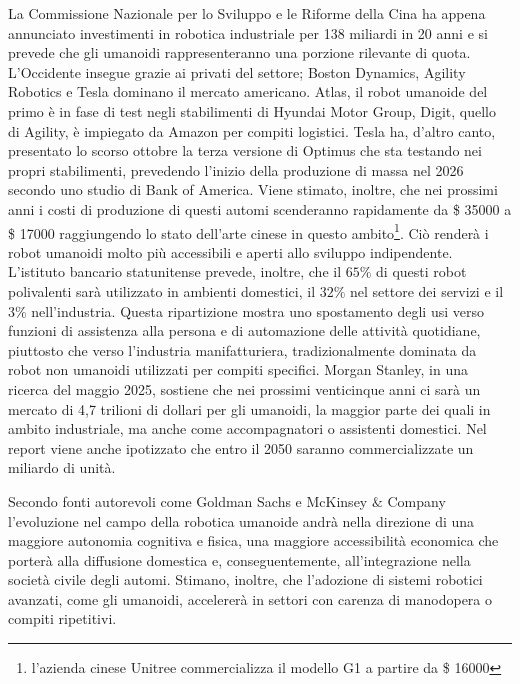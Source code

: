 La Commissione Nazionale per lo Sviluppo e le Riforme della Cina ha appena annunciato investimenti in robotica industriale per 138 miliardi in 20 anni\cite{ifr2023} e si prevede che gli umanoidi rappresenteranno una porzione rilevante di quota. L'Occidente insegue grazie ai privati del settore; Boston Dynamics, Agility Robotics e Tesla dominano il mercato americano. Atlas, il robot umanoide del primo è in fase di test negli stabilimenti di Hyundai Motor Group, Digit, quello di Agility, è impiegato da Amazon per compiti logistici. Tesla ha, d'altro canto, presentato lo scorso ottobre la terza versione di Optimus che sta testando nei propri stabilimenti, prevedendo l'inizio della produzione di massa nel 2026 secondo uno studio \cite{actuia2025} di Bank of America. Viene stimato, inoltre, che nei prossimi anni i costi di produzione di questi automi scenderanno rapidamente da \$ 35000 a \$ 17000 raggiungendo lo stato dell'arte cinese in questo ambito\footnote{l'azienda cinese Unitree commercializza il modello G1 a partire da \$ 16000}. Ciò renderà i robot umanoidi molto più accessibili e aperti allo sviluppo indipendente. L'istituto bancario statunitense prevede, inoltre, che il $65\%$ di questi robot polivalenti sarà utilizzato in ambienti domestici, il $32\%$ nel settore dei servizi e il $3\%$ nell'industria. Questa ripartizione mostra uno spostamento degli usi verso funzioni di assistenza alla persona e di automazione delle attività quotidiane, piuttosto che verso l'industria manifatturiera, tradizionalmente dominata da robot non umanoidi utilizzati per compiti specifici\cite{bofa2025}. Morgan Stanley, in una ricerca \cite{morganstanley2025humanoids} del maggio 2025, sostiene che nei prossimi venticinque anni ci sarà un mercato di 4,7 trilioni di dollari per gli umanoidi, la maggior parte dei quali in ambito industriale, ma anche come accompagnatori o assistenti domestici. Nel report viene anche ipotizzato che entro il 2050 saranno commercializzate un miliardo di unità. 

Secondo fonti autorevoli come Goldman Sachs\cite{goldman2024humanoids} e McKinsey $\&$ Company\cite{mckinsey2021futurework} l'evoluzione nel campo della robotica umanoide andrà nella direzione di una maggiore autonomia cognitiva e fisica, una maggiore accessibilità economica che porterà alla diffusione domestica e, conseguentemente, all'integrazione nella società civile degli automi. Stimano, inoltre, che l'adozione di sistemi robotici avanzati, come gli umanoidi, accelererà in settori con carenza di manodopera o compiti ripetitivi. 


